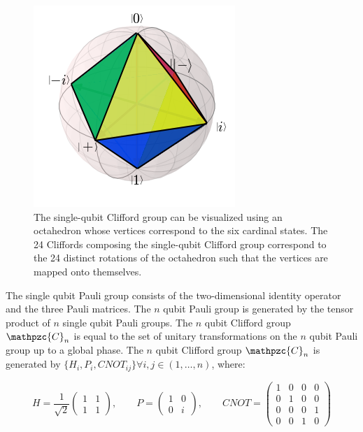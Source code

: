       \begin{figure}[h]%
        \begin{center}
          \includegraphics[width=.5\textwidth]{../Figures/Randomized benchmarking/Bloch sphere octahedron.png}
        \end{center}
        \caption{The single-qubit Clifford group can be visualized using an octahedron whose vertices correspond to the six cardinal states. The 24 Cliffords composing the single-qubit Clifford group correspond to the 24 distinct rotations of the octahedron such that the vertices are mapped onto themselves.}
        \label{fig:Clifford octahedron}
      \end{figure}

      The single qubit Pauli group consists of the two-dimensional identity operator and the three Pauli matrices. The $n$ qubit Pauli group is generated by the tensor product of $n$ single qubit Pauli groups. The $n$ qubit Clifford group $\mathpzc{C}_n$ is equal to the set of unitary transformations on the $n$ qubit Pauli group up to a global phase. The $n$ qubit Clifford group $\mathpzc{C}_n$ is generated by $\{H_i, P_i, CNOT_{ij}\} \forall i, j \in (1, \dots, n)$, where:

      \begin{equation}
        H =
        \frac{1}{\sqrt{2}}
        \begin{pmatrix}
          1 & 1 \\
          1 & 1
        \end{pmatrix}, \qquad
        P =
        \begin{pmatrix}
          1 & 0 \\
          0 & i
        \end{pmatrix}, \qquad
        CNOT =
        \begin{pmatrix}
          1 & 0 & 0 & 0 \\
          0 & 1 & 0 & 0 \\
          0 & 0 & 0 & 1 \\
          0 & 0 & 1 & 0
        \end{pmatrix}
      \end{equation}

